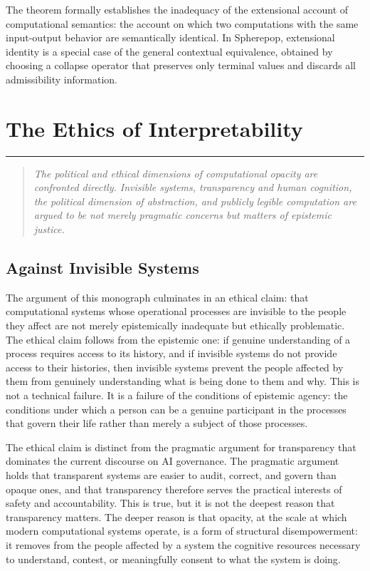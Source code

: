 \documentclass[12pt,openany]{book}
\theoremstyle{plain}
\theoremstyle{definition}
\theoremstyle{remark}
\newcommand{\chapterrule}{%
  \vspace{4pt}%
  {\color{SpherepopBlue}\rule{\textwidth}{0.8pt}}%
  \vspace{10pt}%
}
\newenvironment{chapterprecis}{%
  \begin{quote}\small\itshape}{%
  \end{quote}\medskip}
\begin{document}
The theorem formally establishes the inadequacy of the extensional account of computational semantics: the account on which two computations with the same input-output behavior are semantically identical. In Spherepop, extensional identity is a special case of the general contextual equivalence, obtained by choosing a collapse operator that preserves only terminal values and discards all admissibility information.

\chapter{The Ethics of Interpretability}
\chapterrule

\begin{chapterprecis}
The political and ethical dimensions of computational opacity
are confronted directly. Invisible systems, transparency and
human cognition, the political dimension of abstraction, and
publicly legible computation are argued to be not merely
pragmatic concerns but matters of epistemic justice.
\end{chapterprecis}

\section{Against Invisible Systems}

The argument of this monograph culminates in an ethical claim: that computational systems whose operational processes are invisible to the people they affect are not merely epistemically inadequate but ethically problematic. The ethical claim follows from the epistemic one: if genuine understanding of a process requires access to its history, and if invisible systems do not provide access to their histories, then invisible systems prevent the people affected by them from genuinely understanding what is being done to them and why. This is not a technical failure. It is a failure of the conditions of epistemic agency: the conditions under which a person can be a genuine participant in the processes that govern their life rather than merely a subject of those processes.

The ethical claim is distinct from the pragmatic argument for transparency that dominates the current discourse on AI governance. The pragmatic argument holds that transparent systems are easier to audit, correct, and govern than opaque ones, and that transparency therefore serves the practical interests of safety and accountability. This is true, but it is not the deepest reason that transparency matters. The deeper reason is that opacity, at the scale at which modern computational systems operate, is a form of structural disempowerment: it removes from the people affected by a system the cognitive resources necessary to understand, contest, or meaningfully consent to what the system is doing.
\end{document}
